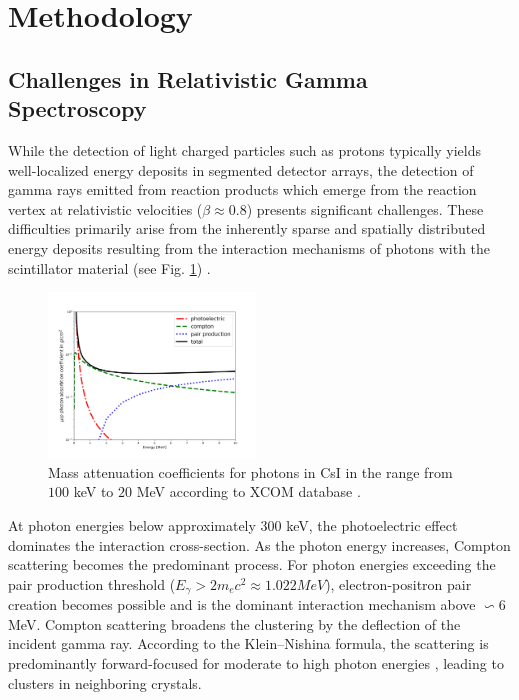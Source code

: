 \documentclass[final,5p,times,twocolumn]{elsarticle}
\begin{document}
\section{Methodology}
\label{sec:metho}
\subsection{Challenges in Relativistic Gamma Spectroscopy}\label{s_sec:gamma_spec}
While the detection of light charged particles such as protons typically yields well-localized energy deposits in segmented detector arrays, the detection of gamma rays emitted from reaction products which emerge from the reaction vertex at relativistic velocities ($\beta \approx 0.8$) presents significant challenges. These difficulties primarily arise from the inherently sparse and spatially distributed energy deposits resulting from the interaction mechanisms of photons with the scintillator material (see Fig. \ref{fig:csi}) \cite{kolanoski2016teilchendetektoren}.\newline
\begin{figure}[!htb]
	\centering 
	\includegraphics[width=0.49\textwidth]{csi_attuenuation.png}	
	\caption{Mass attenuation coefficients for photons in CsI in the range from $100$ keV to $20$ MeV according to XCOM database \cite{seltzer2010xcom}.} 
	\label{fig:csi}%
\end{figure}
At photon energies below approximately $300$ keV, the photoelectric effect dominates the interaction cross-section. As the photon energy increases, Compton scattering becomes the predominant process. For photon energies exceeding the pair production threshold ($E_{\gamma} > 2m_{e}c^2 \approx 1.022 MeV$), electron-positron pair creation becomes possible and is the dominant interaction mechanism above $\backsim 6$ MeV.\newline
Compton scattering broadens the clustering by the deflection of the incident gamma ray. According to the Klein–Nishina formula, the scattering is predominantly forward-focused for moderate to high photon energies \cite{klein1929streuung}, leading to clusters in neighboring crystals.\newline
\end{document}
